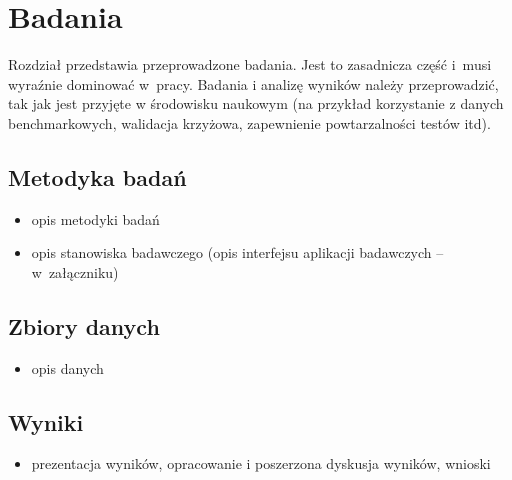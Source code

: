 \chapter{Badania}

 

Rozdział przedstawia przeprowadzone badania. Jest to zasadnicza część i~musi wyraźnie dominować w~pracy.
Badania i analizę wyników należy przeprowadzić, tak jak jest przyjęte w środowisku naukowym (na przykład korzystanie z danych benchmarkowych, walidacja krzyżowa, zapewnienie powtarzalności testów itd). 

\section{Metodyka badań}

\begin{itemize}
\item opis metodyki badań
\item opis stanowiska badawczego (opis interfejsu aplikacji badawczych -- w~załączniku)
\end{itemize}


\section{Zbiory danych}

\begin{itemize}
\item opis danych
\end{itemize}


\section{Wyniki}

\begin{itemize}
\item prezentacja wyników, opracowanie i poszerzona dyskusja  wyników, wnioski
\end{itemize}

